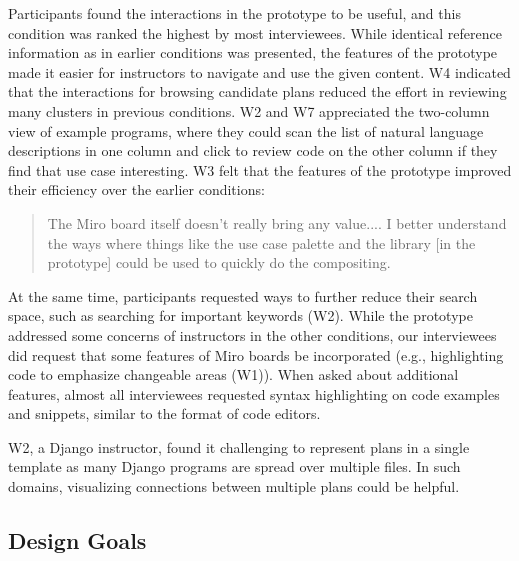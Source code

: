 Participants found the
interactions in the prototype to be useful, and this condition was ranked the highest by most interviewees.  
While identical reference information as in earlier conditions was presented, the features of the prototype made it easier for instructors to navigate and use the given content. W4 indicated that the interactions for browsing candidate plans reduced the effort in reviewing many clusters in previous conditions. W2 and W7 appreciated the two-column view of example programs, where they could scan the list of natural language descriptions in one column  and click to review code on the other column if they find that use case interesting. W3 felt that the features of the prototype improved their efficiency over the earlier conditions:
\begin{quote}
    The Miro board itself doesn't really bring any value....
    I better understand the ways where things like the use case palette and the library [in the prototype] could be used to quickly do the compositing. %
\end{quote}

At the same time, participants requested ways to further reduce their search space, such as searching for important keywords (W2).
While the prototype addressed some concerns of instructors in the other conditions, our interviewees did request that some features of Miro boards be incorporated (e.g., highlighting code to emphasize changeable areas (W1)). When asked about additional features, almost all interviewees requested syntax highlighting on code examples and snippets, similar to the format of code editors.

W2, a Django instructor, found it challenging to represent plans in a single template as many Django programs are spread over multiple files. In such domains, visualizing connections between multiple plans could be helpful. 




\subsection{Design Goals}
\label{sec:design-goals}

